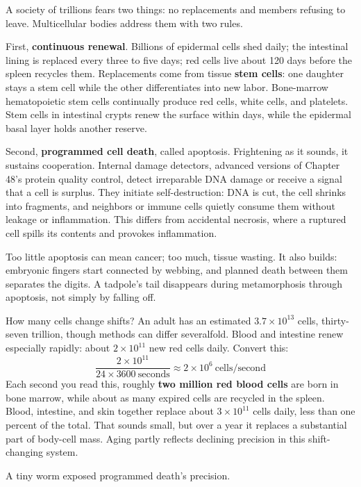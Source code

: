 A society of trillions fears two things: no replacements and members refusing to leave. Multicellular bodies address them with two rules.

First, \textbf{continuous renewal}. Billions of epidermal cells shed daily; the intestinal lining is replaced every three to five days; red cells live about 120 days before the spleen recycles them. Replacements come from tissue \textbf{stem cells}: one daughter stays a stem cell while the other differentiates into new labor. Bone-marrow hematopoietic stem cells continually produce red cells, white cells, and platelets. Stem cells in intestinal crypts renew the surface within days, while the epidermal basal layer holds another reserve.

Second, \textbf{programmed cell death}, called apoptosis. Frightening as it sounds, it sustains cooperation. Internal damage detectors, advanced versions of Chapter 48's protein quality control, detect irreparable DNA damage or receive a signal that a cell is surplus. They initiate self-destruction: DNA is cut, the cell shrinks into fragments, and neighbors or immune cells quietly consume them without leakage or inflammation. This differs from accidental necrosis, where a ruptured cell spills its contents and provokes inflammation.

Too little apoptosis can mean cancer; too much, tissue wasting. It also builds: embryonic fingers start connected by webbing, and planned death between them separates the digits. A tadpole's tail disappears during metamorphosis through apoptosis, not simply by falling off.

\begin{qiaoliang}
How many cells change shifts? An adult has an estimated $3.7\times 10^{13}$ cells, thirty-seven trillion, though methods can differ severalfold. Blood and intestine renew especially rapidly: about $2\times 10^{11}$ new red cells daily. Convert this:
\[
\frac{2\times 10^{11}}{24\times 3600\ \text{seconds}} \approx 2\times 10^{6}\ \text{cells/second}
\]
Each second you read this, roughly \textbf{two million red blood cells} are born in bone marrow, while about as many expired cells are recycled in the spleen. Blood, intestine, and skin together replace about $3\times 10^{11}$ cells daily, less than one percent of the total. That sounds small, but over a year it replaces a substantial part of body-cell mass. Aging partly reflects declining precision in this shift-changing system.
\end{qiaoliang}

A tiny worm exposed programmed death's precision.

